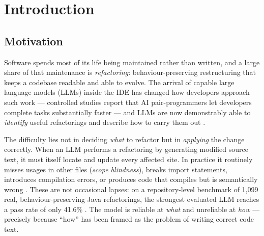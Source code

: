 %
\chapter{Introduction}
\label{ch:intro}

\section{Motivation}
\label{sec:intro-motivation}

Software spends most of its life being maintained rather than written, and a
large share of that maintenance is \emph{refactoring}: behaviour-preserving
restructuring that keeps a codebase readable and able to evolve. The arrival of
capable large language models (LLMs) inside the IDE has changed how developers
approach such work --- controlled studies report that AI pair-programmers let
developers complete tasks substantially faster \citep{copilotproductivity2023}
--- and LLMs are now demonstrably able to \emph{identify} useful refactorings
and describe how to carry them out \citep{cordeiro2024refactoring,
potentialllm2024}.

The difficulty lies not in deciding \emph{what} to refactor but in
\emph{applying} the change correctly. When an LLM performs a refactoring by
generating modified source text, it must itself locate and update every affected
site. In practice it routinely misses usages in other files
(\emph{scope blindness}), breaks import statements, introduces compilation
errors, or produces code that compiles but is semantically wrong
\citep{llmrefactorlimits2025}. These are not occasional lapses: on a
repository-level benchmark of 1{,}099 real, behaviour-preserving Java
refactorings, the strongest evaluated LLM reaches a pass rate of only 41.6\%
\citep{swerefactor2025}. The model is reliable at \emph{what} and unreliable at
\emph{how} --- precisely because ``how'' has been framed as the problem of
writing correct code text.

